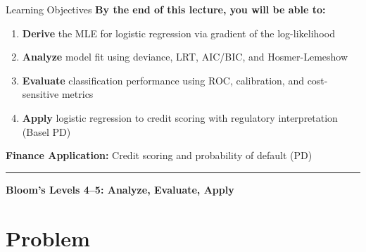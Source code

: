 \documentclass[8pt,aspectratio=169]{beamer}
\newcommand{\bottomnote}[1]{%
\vfill
\vspace{-2mm}
\textcolor{mllavender2}{\rule{\textwidth}{0.4pt}}
\vspace{1mm}
\footnotesize
\textbf{#1}
}
\begin{document}
\begin{frame}[t]{Learning Objectives}
\textbf{By the end of this lecture, you will be able to:}
\begin{enumerate}
  \item \textbf{Derive} the MLE for logistic regression via gradient of the log-likelihood
  \item \textbf{Analyze} model fit using deviance, LRT, AIC/BIC, and Hosmer-Lemeshow
  \item \textbf{Evaluate} classification performance using ROC, calibration, and cost-sensitive metrics
  \item \textbf{Apply} logistic regression to credit scoring with regulatory interpretation (Basel PD)
\end{enumerate}
\vspace{1em}
\textbf{Finance Application:} Credit scoring and probability of default (PD)
\bottomnote{Bloom's Levels 4--5: Analyze, Evaluate, Apply}
\end{frame}


\section{Problem}
\end{document}
